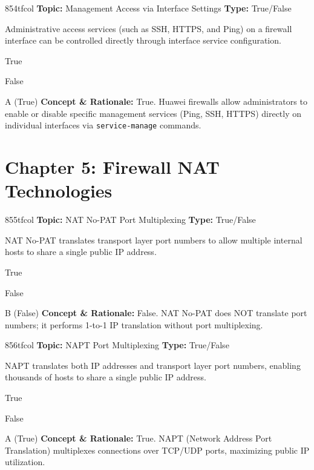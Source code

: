 \begin{qcard}{854}{tfcol}
\textcolor{darkslate!75}{\small\textbf{Topic:} Management Access via Interface Settings \hfill \textbf{Type:} True/False}\vspace{0.4em}\par
Administrative access services (such as SSH, HTTPS, and Ping) on a firewall interface can be controlled directly through interface service configuration.
\begin{qoptions}
\item True
\item False
\end{qoptions}
\end{qcard}
\nopagebreak
\begin{explainbox}{A (True)}
\textbf{Concept \& Rationale:} True. Huawei firewalls allow administrators to enable or disable specific management services (Ping, SSH, HTTPS) directly on individual interfaces via \texttt{service-manage} commands.
\end{explainbox}

\section{Chapter 5: Firewall NAT Technologies}

\begin{qcard}{855}{tfcol}
\textcolor{darkslate!75}{\small\textbf{Topic:} NAT No-PAT Port Multiplexing \hfill \textbf{Type:} True/False}\vspace{0.4em}\par
NAT No-PAT translates transport layer port numbers to allow multiple internal hosts to share a single public IP address.
\begin{qoptions}
\item True
\item False
\end{qoptions}
\end{qcard}
\nopagebreak
\begin{explainbox}{B (False)}
\textbf{Concept \& Rationale:} False. NAT No-PAT does NOT translate port numbers; it performs 1-to-1 IP translation without port multiplexing.
\end{explainbox}

\begin{qcard}{856}{tfcol}
\textcolor{darkslate!75}{\small\textbf{Topic:} NAPT Port Multiplexing \hfill \textbf{Type:} True/False}\vspace{0.4em}\par
NAPT translates both IP addresses and transport layer port numbers, enabling thousands of hosts to share a single public IP address.
\begin{qoptions}
\item True
\item False
\end{qoptions}
\end{qcard}
\nopagebreak
\begin{explainbox}{A (True)}
\textbf{Concept \& Rationale:} True. NAPT (Network Address Port Translation) multiplexes connections over TCP/UDP ports, maximizing public IP utilization.
\end{explainbox}

